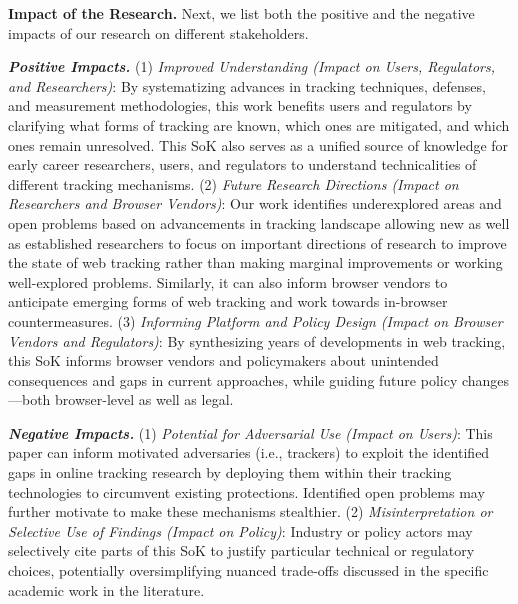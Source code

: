 \documentclass[letterpaper,twocolumn,10pt]{article}
\begin{document}
\noindent \textbf{Impact of the Research.} 
%
Next, we list both the positive and the negative impacts of our research on different stakeholders.

\noindent \textbf{\textit{Positive Impacts.}} 
%
(1) \textit{Improved Understanding (Impact on Users, Regulators, and Researchers)}: 
%
By systematizing advances in tracking techniques, defenses, and measurement methodologies, this work benefits users and regulators by clarifying what forms of tracking are known, which ones are mitigated, and which ones remain unresolved. 
%
This SoK also serves as a unified source of knowledge for early career researchers, users, and regulators to understand technicalities of different tracking mechanisms. 
%
(2) \textit{Future Research Directions (Impact on Researchers and Browser Vendors)}: 
%
Our work identifies underexplored areas and open problems based on advancements in tracking landscape allowing new as well as established researchers to focus on important directions of research to improve the state of web tracking rather than making marginal improvements or working well-explored problems. 
%
Similarly, it can also inform browser vendors to anticipate emerging forms of web tracking and work towards in-browser countermeasures. 
%
(3) \textit{Informing Platform and Policy Design (Impact on Browser Vendors and Regulators)}: 
%
By synthesizing years of developments in web tracking, this SoK informs browser vendors and policymakers about unintended consequences and gaps in current approaches, while guiding future policy changes---both browser-level as well as legal. 

\noindent \textbf{\textit{Negative Impacts.}} 
%
(1) \textit{Potential for Adversarial Use (Impact on Users)}: 
%
This paper can inform motivated adversaries (i.e., trackers) to exploit the identified gaps in online tracking research by deploying them within their tracking technologies to circumvent existing protections. 
%
Identified open problems may further motivate to make these mechanisms stealthier.
%
(2) \textit{Misinterpretation or Selective Use of Findings (Impact on Policy)}: 
%
Industry or policy actors may selectively cite parts of this SoK to justify particular technical or regulatory choices, potentially oversimplifying nuanced trade-offs discussed in the specific academic work in the literature.\\ 
\end{document}
